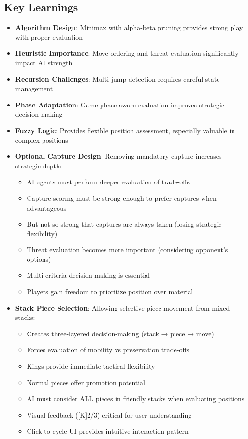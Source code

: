 \documentclass[12pt,a4paper]{article}
\begin{document}
\subsection{Key Learnings}

\begin{itemize}
    \item \textbf{Algorithm Design}: Minimax with alpha-beta pruning provides strong play with proper evaluation
    \item \textbf{Heuristic Importance}: Move ordering and threat evaluation significantly impact AI strength
    \item \textbf{Recursion Challenges}: Multi-jump detection requires careful state management
    \item \textbf{Phase Adaptation}: Game-phase-aware evaluation improves strategic decision-making
    \item \textbf{Fuzzy Logic}: Provides flexible position assessment, especially valuable in complex positions
    \item \textbf{Optional Capture Design}: Removing mandatory capture increases strategic depth:
    \begin{itemize}
        \item AI agents must perform deeper evaluation of trade-offs
        \item Capture scoring must be strong enough to prefer captures when advantageous
        \item But not so strong that captures are always taken (losing strategic flexibility)
        \item Threat evaluation becomes more important (considering opponent's options)
        \item Multi-criteria decision making is essential
        \item Players gain freedom to prioritize position over material
    \end{itemize}
    \item \textbf{Stack Piece Selection}: Allowing selective piece movement from mixed stacks:
    \begin{itemize}
        \item Creates three-layered decision-making (stack → piece → move)
        \item Forces evaluation of mobility vs preservation trade-offs
        \item Kings provide immediate tactical flexibility
        \item Normal pieces offer promotion potential
        \item AI must consider ALL pieces in friendly stacks when evaluating positions
        \item Visual feedback ([K]2/3) critical for user understanding
        \item Click-to-cycle UI provides intuitive interaction pattern
    \end{itemize}
\end{itemize}
\end{document}
